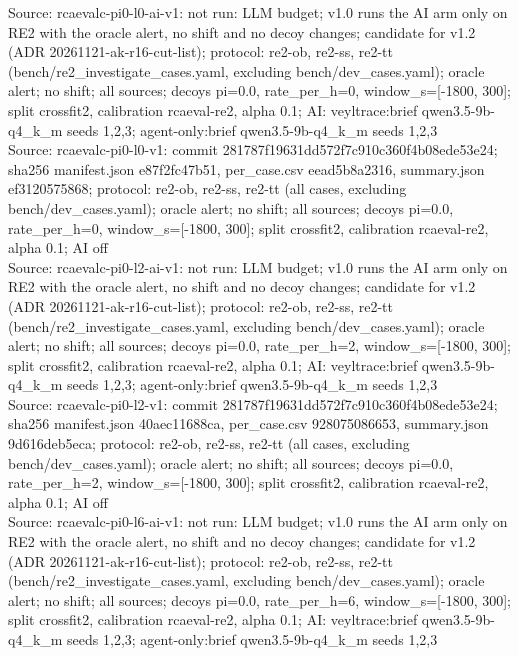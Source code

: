 \begin{table}[t]
Source: rcaevalc-pi0-l0-ai-v1: not run: LLM budget; v1.0 runs the AI arm only on RE2 with the oracle alert, no shift and no decoy changes; candidate for v1.2 (ADR 20261121-ak-r16-cut-list); protocol: re2-ob, re2-ss, re2-tt (bench/re2\_investigate\_cases.yaml, excluding bench/dev\_cases.yaml); oracle alert; no shift; all sources; decoys pi=0.0, rate\_per\_h=0, window\_s=[-1800, 300]; split crossfit2, calibration rcaeval-re2, alpha 0.1; AI: veyltrace:brief qwen3.5-9b-q4\_k\_m seeds 1,2,3; agent-only:brief qwen3.5-9b-q4\_k\_m seeds 1,2,3\\
Source: rcaevalc-pi0-l0-v1: commit 281787f19631dd572f7c910c360f4b08ede53e24; sha256 manifest.json e87f2fc47b51, per\_case.csv eead5b8a2316, summary.json ef3120575868; protocol: re2-ob, re2-ss, re2-tt (all cases, excluding bench/dev\_cases.yaml); oracle alert; no shift; all sources; decoys pi=0.0, rate\_per\_h=0, window\_s=[-1800, 300]; split crossfit2, calibration rcaeval-re2, alpha 0.1; AI off\\
Source: rcaevalc-pi0-l2-ai-v1: not run: LLM budget; v1.0 runs the AI arm only on RE2 with the oracle alert, no shift and no decoy changes; candidate for v1.2 (ADR 20261121-ak-r16-cut-list); protocol: re2-ob, re2-ss, re2-tt (bench/re2\_investigate\_cases.yaml, excluding bench/dev\_cases.yaml); oracle alert; no shift; all sources; decoys pi=0.0, rate\_per\_h=2, window\_s=[-1800, 300]; split crossfit2, calibration rcaeval-re2, alpha 0.1; AI: veyltrace:brief qwen3.5-9b-q4\_k\_m seeds 1,2,3; agent-only:brief qwen3.5-9b-q4\_k\_m seeds 1,2,3\\
Source: rcaevalc-pi0-l2-v1: commit 281787f19631dd572f7c910c360f4b08ede53e24; sha256 manifest.json 40aec11688ca, per\_case.csv 928075086653, summary.json 9d616deb5eca; protocol: re2-ob, re2-ss, re2-tt (all cases, excluding bench/dev\_cases.yaml); oracle alert; no shift; all sources; decoys pi=0.0, rate\_per\_h=2, window\_s=[-1800, 300]; split crossfit2, calibration rcaeval-re2, alpha 0.1; AI off\\
Source: rcaevalc-pi0-l6-ai-v1: not run: LLM budget; v1.0 runs the AI arm only on RE2 with the oracle alert, no shift and no decoy changes; candidate for v1.2 (ADR 20261121-ak-r16-cut-list); protocol: re2-ob, re2-ss, re2-tt (bench/re2\_investigate\_cases.yaml, excluding bench/dev\_cases.yaml); oracle alert; no shift; all sources; decoys pi=0.0, rate\_per\_h=6, window\_s=[-1800, 300]; split crossfit2, calibration rcaeval-re2, alpha 0.1; AI: veyltrace:brief qwen3.5-9b-q4\_k\_m seeds 1,2,3; agent-only:brief qwen3.5-9b-q4\_k\_m seeds 1,2,3\\

\end{table}
